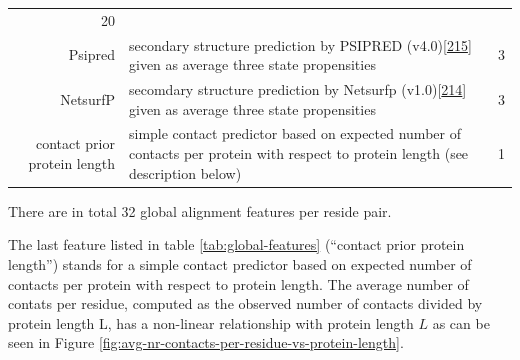 \documentclass[11pt,a4paper,twoside]{book}
\theoremstyle{definition}
\theoremstyle{definition}
\theoremstyle{remark}
\begin{document}
\begin{longtable}[]{@{}rlc@{}}
\begin{minipage}[t]{0.18\columnwidth}
20\strut
\end{minipage}\tabularnewline
\begin{minipage}[t]{0.23\columnwidth}\raggedleft\strut
Psipred\strut
\end{minipage} & \begin{minipage}[t]{0.50\columnwidth}\raggedright\strut
secondary structure prediction by PSIPRED
(v4.0){[}\protect\hyperlink{ref-Jones1999}{215}{]} given as average
three state propensities\strut
\end{minipage} & \begin{minipage}[t]{0.18\columnwidth}\centering\strut
3\strut
\end{minipage}\tabularnewline
\begin{minipage}[t]{0.23\columnwidth}\raggedleft\strut
NetsurfP\strut
\end{minipage} & \begin{minipage}[t]{0.50\columnwidth}\raggedright\strut
secomdary structure prediction by Netsurfp
(v1.0){[}\protect\hyperlink{ref-Petersen2009a}{214}{]} given as average
three state propensities\strut
\end{minipage} & \begin{minipage}[t]{0.18\columnwidth}\centering\strut
3\strut
\end{minipage}\tabularnewline
\begin{minipage}[t]{0.23\columnwidth}\raggedleft\strut
contact prior protein length\strut
\end{minipage} & \begin{minipage}[t]{0.50\columnwidth}\raggedright\strut
simple contact predictor based on expected number of contacts per
protein with respect to protein length (see description below)\strut
\end{minipage} & \begin{minipage}[t]{0.18\columnwidth}\centering\strut
1\strut
\end{minipage}\tabularnewline
\bottomrule
\end{longtable}

There are in total 32 global alignment features per reside pair.

The last feature listed in table \ref{tab:global-features} (``contact
prior protein length'') stands for a simple contact predictor based on
expected number of contacts per protein with respect to protein length.
The average number of contats per residue, computed as the observed
number of contacts divided by protein length L, has a non-linear
relationship with protein length \(L\) as can be seen in Figure
\ref{fig:avg-nr-contacts-per-residue-vs-protein-length}.
\end{document}

